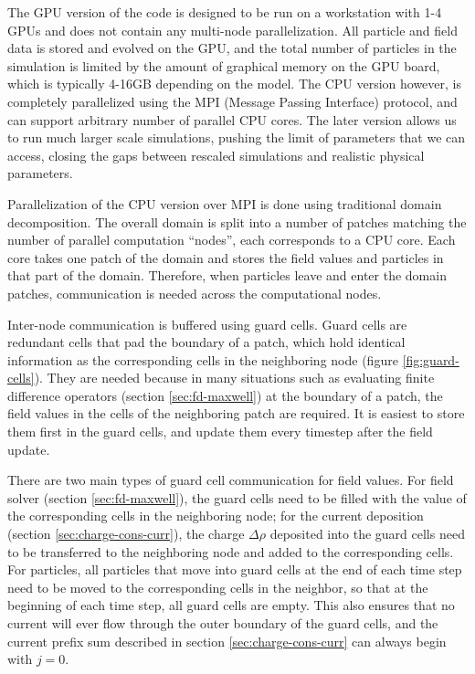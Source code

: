 The GPU version of the code is designed to be run on a workstation with 1-4 GPUs
and does not contain any multi-node parallelization. All particle and field data
is stored and evolved on the GPU, and the total number of particles in the
simulation is limited by the amount of graphical memory on the GPU board, which
is typically 4-16GB depending on the model. The CPU version however, is
completely parallelized using the MPI (Message Passing Interface) protocol, and
can support arbitrary number of parallel CPU cores. The later version allows us
to run much larger scale simulations, pushing the limit of parameters that we
can access, closing the gaps between rescaled simulations and realistic physical
parameters.

Parallelization of the CPU version over MPI is done using traditional domain
decomposition. The overall domain is split into a number of patches matching the
number of parallel computation ``nodes'', each corresponds to a CPU core. Each
core takes one patch of the domain and stores the field values and particles in
that part of the domain. Therefore, when particles leave and enter the domain
patches, communication is needed across the computational nodes.

Inter-node communication is buffered using guard cells. Guard cells are
redundant cells that pad the boundary of a patch, which hold identical
information as the corresponding cells in the neighboring node (figure
\ref{fig:guard-cells}). They are needed because in many situations such as
evaluating finite difference operators (section \ref{sec:fd-maxwell}) at the
boundary of a patch, the field values in the cells of the neighboring patch are
required. It is easiest to store them first in the guard cells, and update them
every timestep after the field update.

There are two main types of guard cell communication for field values. For field
solver (section \ref{sec:fd-maxwell}), the guard cells need to be filled with
the value of the corresponding cells in the neighboring node; for the current
deposition (section \ref{sec:charge-cons-curr}), the charge $\Delta \rho$
deposited into the guard cells need to be transferred to the neighboring node
and added to the corresponding cells. For particles, all particles that move
into guard cells at the end of each time step need to be moved to the
corresponding cells in the neighbor, so that at the beginning of each time step,
all guard cells are empty. This also ensures that no current will ever flow
through the outer boundary of the guard cells, and the current prefix sum
described in section \ref{sec:charge-cons-curr} can always begin with $j=0$.

